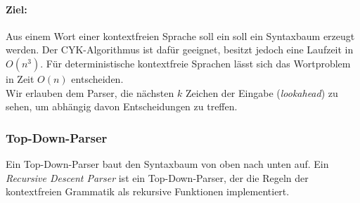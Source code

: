 \documentclass{scrreprt}
\begin{document}
\paragraph{Ziel:} Aus einem Wort einer kontextfreien Sprache soll ein soll ein Syntaxbaum erzeugt werden. Der CYK-Algorithmus ist dafür geeignet, besitzt jedoch eine Laufzeit in $O(n^3)$. Für deterministische kontextfreie Sprachen lässt sich das Wortproblem in Zeit $O(n)$ entscheiden.\\
Wir erlauben dem Parser, die nächsten $k$ Zeichen der Eingabe (\emph{lookahead}) zu sehen, um abhängig davon Entscheidungen zu treffen.

\subsubsection{Top-Down-Parser}
Ein Top-Down-Parser baut den Syntaxbaum von oben nach unten auf. Ein \emph{Recursive Descent Parser} ist ein Top-Down-Parser, der die Regeln der kontextfreien Grammatik als rekursive Funktionen implementiert.
\end{document}
